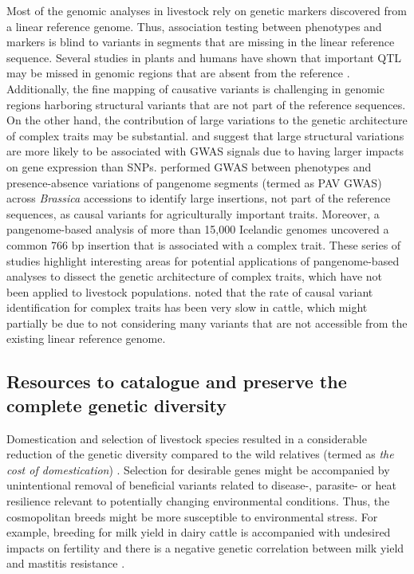 \documentclass[../main.tex]{subfiles}
\begin{document}
Most of the genomic analyses in livestock rely on genetic markers discovered from a linear reference genome. Thus, association testing between phenotypes and markers is blind to variants in segments that are missing in the linear reference sequence. Several studies in plants and humans have shown that important QTL may be missed in genomic regions that are absent from the reference \citep{kehr2017diversity,gage2019multiple,song2020eight}. Additionally, the fine mapping of causative variants is challenging in genomic regions harboring structural variants that are not part of the reference sequences. On the other hand, the contribution of large variations to the genetic architecture of complex traits may be substantial. \citet{chiang2017impact} and \citet{chaisson2019multi} suggest that large structural variations are more likely to be associated with GWAS signals due to having larger impacts on gene expression than SNPs. \citet{song2020eight} performed GWAS between phenotypes and presence-absence variations of pangenome segments (termed as PAV GWAS) across \emph{Brassica} accessions  to identify large insertions, not part of the reference sequences, as causal variants for agriculturally important traits. Moreover, a pangenome-based analysis of more than 15,000 Icelandic genomes uncovered a common 766 bp insertion \citep{kehr2017diversity} that is associated with a complex trait. These series of studies highlight interesting areas for potential applications of pangenome-based analyses to dissect the genetic architecture of complex traits, which have not been applied to livestock populations. \citet{hayes20191000} noted that the rate of causal variant identification for complex traits has been very slow in cattle, which might partially be due to not considering many variants that are not accessible from the existing linear reference genome. 

\subsection*{Resources to catalogue and preserve the complete genetic diversity}

Domestication and selection of livestock species resulted in a considerable reduction of the genetic diversity compared to the wild relatives (termed as \emph{the cost of domestication}) \citep{mchugo2019unlocking}. Selection for desirable genes might be accompanied by unintentional removal of beneficial variants related to disease-, parasite-  or heat resilience relevant to potentially changing environmental conditions. Thus, the cosmopolitan breeds might be more susceptible to environmental stress. For example, breeding for milk yield in dairy cattle is accompanied with undesired impacts on fertility \citep{pryce2004fertility} and there is a negative genetic correlation between milk yield and mastitis resistance \citep{cai2020distinguishing}. 
\end{document}

